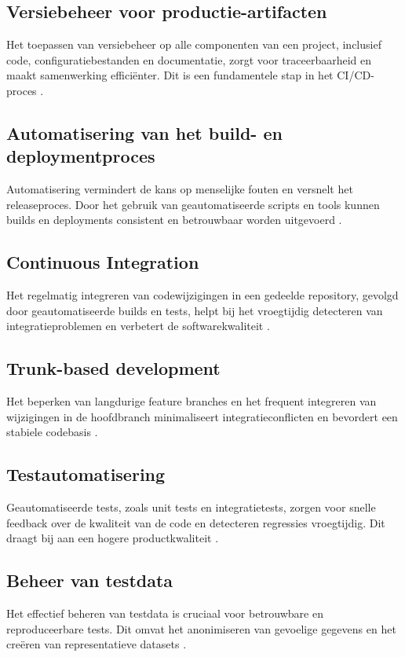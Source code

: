 \subsection{Versiebeheer voor productie-artifacten}
Het toepassen van versiebeheer op alle componenten van een project, inclusief code, configuratiebestanden en documentatie, zorgt voor traceerbaarheid en maakt samenwerking efficiënter. Dit is een fundamentele stap in het CI/CD-proces \autocite{forsgren2018}.

\subsection{Automatisering van het build- en deploymentproces}
Automatisering vermindert de kans op menselijke fouten en versnelt het releaseproces. Door het gebruik van geautomatiseerde scripts en tools kunnen builds en deployments consistent en betrouwbaar worden uitgevoerd \autocite{shahin2017}.

\subsection{Continuous Integration}
Het regelmatig integreren van codewijzigingen in een gedeelde repository, gevolgd door geautomatiseerde builds en tests, helpt bij het vroegtijdig detecteren van integratieproblemen en verbetert de softwarekwaliteit \autocite{forsgren2018}.

\subsection{Trunk-based development}
Het beperken van langdurige feature branches en het frequent integreren van wijzigingen in de hoofdbranch minimaliseert integratieconflicten en bevordert een stabiele codebasis \autocite{forsgren2018}.

\subsection{Testautomatisering}
Geautomatiseerde tests, zoals unit tests en integratietests, zorgen voor snelle feedback over de kwaliteit van de code en detecteren regressies vroegtijdig. Dit draagt bij aan een hogere productkwaliteit \autocite{wang2022}.

\subsection{Beheer van testdata}
Het effectief beheren van testdata is cruciaal voor betrouwbare en reproduceerbare tests. Dit omvat het anonimiseren van gevoelige gegevens en het creëren van representatieve datasets \autocite{shahin2017}.

